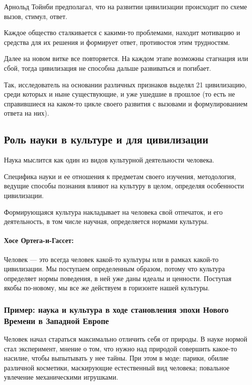 \begin{itemize}
Арнольд Тойнби предполагал, что на развитии цивилизации происходит по схеме
вызов, стимул, ответ. 

Каждое общество сталкивается с какими-то проблемами,
находит мотивацию и средства для их решения и формирует ответ,
противостоя этим трудностям. 

Далее на новом витке все повторяется. На каждом
этапе возможны стагнация или сбой, тогда цивилизация не способна дальше
развиваться и погибает. 

Так, исследователь на основании различных признаков
выделял 21 цивилизацию, среди которых и ныне существующие, и уже ушедшие в
прошлое (то есть не справившиеся на каком-то цикле своего развития с вызовами и
формулированием ответа на них). 
\end{itemize}


\subsection{Роль науки в культуре и для цивилизации}

Наука мыслится как один из видов культурной деятельности человека. 

Специфика науки и ее отношения к предметам своего изучения,
методология, ведущие способы познания влияют на культуру в целом, определяя
особенности цивилизации.

Формирующаяся культура накладывает на человека свой отпечаток, и его деятельность, в том числе научная, определяется нормами культуры.

\paragraph{Хосе Ортега-и-Гассет:} Человек — это всегда человек какой-то культуры или в рамках какой-то цивилизации. Мы поступаем определенным образом, потому что культура определяет нормы поведения, в ней уже даны идеалы и ценности. Поступая якобы по-новому, мы все же
действуем в горизонте нашей культуры.


\subsubsection{Пример: наука и культура в ходе становления эпохи Нового Времени в Западной Европе} 

Человек начал стараться максимально отличить себя от природы. 
В науке нормой стал эксперимент, мнение о том, что нужно над природой совершить какое-то насилие, чтобы  выпытывать у нее тайны. При этом в моде: парики, обилие различной косметики, маскирующие естественный вид человека; повальное увлечение механическими игрушками.

